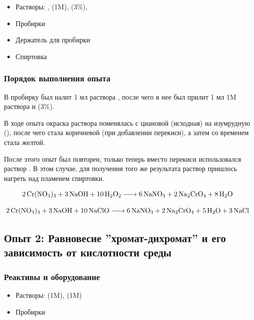 \documentclass[a4paper, 12pt]{article}
\begin{document}
\begin{itemize}
	\item Растворы: ,  (1M),  (3\%), 
	
	\item Пробирки
	
	\item Держатель для пробирки
	
	\item Спиртовка 
\end{itemize}

\subsubsection{Порядок выполнения опыта}

В пробирку был налит 1 мл раствора , после чего в нее был прилит 1 мл 1M раствора  и  (3\%).

В ходе опыта окраска раствора поменялась с циановой (исходная) на изумрудную (), после чего стала коричневой (при добавлении перекиси), а затем со временем стала желтой. 

После этого опыт был повторен, только теперь вместо перекиси использовался раствор . В этом случае, для получения того же результата раствор пришлось нагреть над пламенем спиртовки.

\begin{equation}
	\ce{2 Cr(NO3)3 + 3 NaOH + 10 H2O2 -> 6 NaNO3 + 2 Na2CrO4 + 8 H2O} 
\end{equation}

\begin{equation}
	\ce{2 Cr(NO3)3 + 3 NaOH + 10 NaClO -> 6 NaNO3 + 2 Na2CrO4 + 5 H2O + 3NaCl} 
\end{equation}

\subsection{Опыт 2: Равновесие ''хромат-дихромат'' и его зависимость от кислотности среды}

\subsubsection{Реактивы и оборудование}

\begin{itemize}
	\item Растворы:  (1M),  (1M)
	
	\item Пробирки
\end{itemize}
\end{document}
